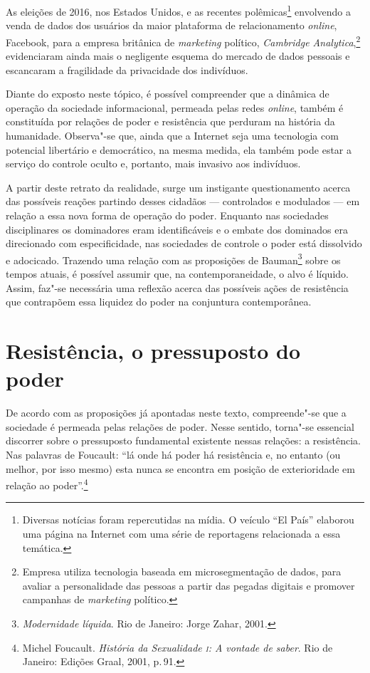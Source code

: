 As eleições de 2016, nos Estados Unidos, e as recentes
polêmicas\footnote{Diversas notícias foram repercutidas na mídia. O
  veículo ``El País'' elaborou uma página na Internet com uma série de
  reportagens relacionada a essa temática.} envolvendo a venda de dados
dos usuários da maior plataforma de relacionamento \textit{online}, Facebook,
para a empresa britânica de \textit{marketing} político, \textit{Cambridge
Analytica},\footnote{Empresa utiliza tecnologia baseada em
  microsegmentação de dados, para avaliar a personalidade das pessoas a
  partir das pegadas digitais e promover campanhas de \textit{marketing}
  político.} evidenciaram ainda mais o negligente esquema do
mercado de dados pessoais e escancaram a fragilidade da privacidade dos
indivíduos.

Diante do exposto neste tópico, é possível compreender que a dinâmica de
operação da sociedade informacional, permeada pelas redes \textit{online}, também
é constituída por relações de poder e resistência que perduram na
história da humanidade. Observa"-se que, ainda que a Internet seja uma
tecnologia com potencial libertário e democrático, na mesma medida, ela
também pode estar a serviço do controle oculto e, portanto, mais
invasivo aos indivíduos.

A partir deste retrato da realidade, surge um instigante questionamento
acerca das possíveis reações partindo desses cidadãos --- controlados e
modulados --- em relação a essa nova forma de operação do poder. Enquanto
nas sociedades disciplinares os dominadores eram identificáveis e o
embate dos dominados era direcionado com especificidade, nas sociedades
de controle o poder está dissolvido e adocicado. Trazendo uma relação
com as proposições de Bauman\footnote{\textit{Modernidade líquida}. Rio de Janeiro: Jorge Zahar, 2001.} sobre os tempos atuais, é possível
assumir que, na contemporaneidade, o alvo é líquido. Assim, faz"-se
necessária uma reflexão acerca das possíveis ações de resistência que
contrapõem essa liquidez do poder na conjuntura contemporânea.

\section{Resistência, o pressuposto do poder}

De acordo com as proposições já apontadas neste texto, compreende"-se que
a sociedade é permeada pelas relações de poder. Nesse sentido, torna"-se
essencial discorrer sobre o pressuposto fundamental existente nessas
relações: a resistência. Nas palavras de Foucault: ``lá onde há poder há
resistência e, no entanto (ou melhor, por isso mesmo) esta nunca se
encontra em posição de exterioridade em relação ao poder''.\footnote{Michel Foucault. \textit{História da Sexualidade \textsc{i}: A vontade de saber}. Rio de Janeiro: Edições Graal, 2001, p.\,91.}

